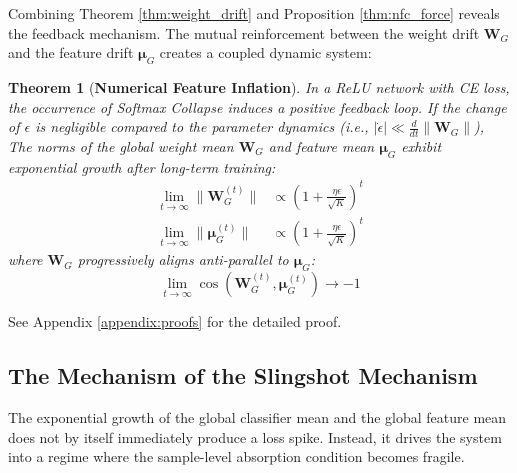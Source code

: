 \documentclass{article}
\theoremstyle{plain}
\newtheorem{theorem}{Theorem}[section]
\theoremstyle{definition}
\theoremstyle{remark}
\begin{document}
Combining Theorem \ref{thm:weight_drift} and Proposition \ref{thm:nfc_force} reveals the feedback mechanism.
The mutual reinforcement between the weight drift $\bm{W}_G$ and the feature drift $\bm{\mu}_G$ creates a coupled dynamic system:

\begin{theorem}[\textbf{Numerical Feature Inflation}]
\label{thm:nfc}
In a ReLU network with CE loss, the occurrence of Softmax Collapse induces a positive feedback loop. 
If the change of $\epsilon$ is negligible compared to the parameter dynamics (i.e., $|\dot{\epsilon}| \ll \frac{d}{dt}\|\bm{W}_G\|$),
The norms of the global weight mean $\bm{W}_G$ and feature mean $\bm{\mu}_G$ exhibit exponential growth after long-term training:
\begin{align}
    \lim_{t \to \infty} \|\bm{W}_G^{(t)}\| &\propto \left(1 + \frac{\eta\epsilon}{\sqrt{K}}\right)^t \\
    \lim_{t \to \infty}\|\bm{\mu}_G^{(t)}\| &\propto \left(1 + \frac{\eta\epsilon}{\sqrt{K}}\right)^t \label{eq:mu_G}
\end{align}
where $\bm{W}_G$ progressively aligns anti-parallel to $\bm{\mu}_G$:
\begin{equation}
    \lim_{t \to \infty} \cos(\bm{W}_G^{(t)}, \bm{\mu}_G^{(t)}) \to -1
\end{equation}
\end{theorem}

See Appendix \ref{appendix:proofs} for the detailed proof.

\subsection{The Mechanism of the Slingshot Mechanism}
\label{sec:mec}
The exponential growth of the global classifier mean and the global feature mean 
does not by itself immediately produce a loss spike. 
Instead, it drives the system into a regime where the sample-level absorption condition becomes fragile.
\end{document}
